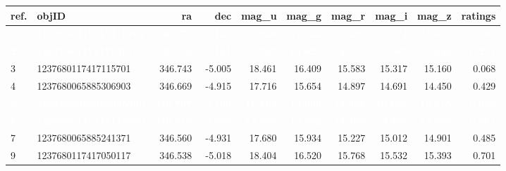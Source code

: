 \documentclass[]{elsarticle} %
\begin{document}
\begin{table}[H]
\centering
\begin{tabular}{l|l|r|r|r|r|r|r|r|r}
\hline
ref. & objID & ra & dec & mag\_u & mag\_g & mag\_r & mag\_i & mag\_z & ratings\\
\hline
\rowcolor[HTML]{D7261E}  \textcolor{white}{\textbf{1}} & \textcolor{white}{\textbf{1237680117417115762}} & \textcolor{white}{\textbf{346.676}} & \textcolor{white}{\textbf{-5.120}} & \textcolor{white}{\textbf{18.920}} & \textcolor{white}{\textbf{17.022}} & \textcolor{white}{\textbf{16.282}} & \textcolor{white}{\textbf{15.974}} & \textcolor{white}{\textbf{15.851}} & \textcolor{white}{\textbf{0.380}}\\
\hline
\rowcolor[HTML]{D7261E}  \textcolor{white}{\textbf{2}} & \textcolor{white}{\textbf{1237680117417050133}} & \textcolor{white}{\textbf{346.594}} & \textcolor{white}{\textbf{-5.161}} & \textcolor{white}{\textbf{16.702}} & \textcolor{white}{\textbf{14.825}} & \textcolor{white}{\textbf{14.068}} & \textcolor{white}{\textbf{13.887}} & \textcolor{white}{\textbf{13.648}} & \textcolor{white}{\textbf{0.241}}\\
\hline
3 & 1237680117417115701 & 346.743 & -5.005 & 18.461 & 16.409 & 15.583 & 15.317 & 15.160 & 0.068\\
\hline
4 & 1237680065885306903 & 346.669 & -4.915 & 17.716 & 15.654 & 14.897 & 14.691 & 14.450 & 0.429\\
\hline
\rowcolor[HTML]{D7261E}  \textcolor{white}{\textbf{5}} & \textcolor{white}{\textbf{1237680065348435996}} & \textcolor{white}{\textbf{346.707}} & \textcolor{white}{\textbf{-5.199}} & \textcolor{white}{\textbf{16.704}} & \textcolor{white}{\textbf{14.699}} & \textcolor{white}{\textbf{13.905}} & \textcolor{white}{\textbf{13.676}} & \textcolor{white}{\textbf{13.515}} & \textcolor{white}{\textbf{0.322}}\\
\hline
\rowcolor[HTML]{D7261E}  \textcolor{white}{\textbf{6}} & \textcolor{white}{\textbf{1237680117417115683}} & \textcolor{white}{\textbf{346.713}} & \textcolor{white}{\textbf{-5.050}} & \textcolor{white}{\textbf{17.585}} & \textcolor{white}{\textbf{15.782}} & \textcolor{white}{\textbf{15.109}} & \textcolor{white}{\textbf{14.867}} & \textcolor{white}{\textbf{14.798}} & \textcolor{white}{\textbf{0.361}}\\
\hline
7 & 1237680065885241371 & 346.560 & -4.931 & 17.680 & 15.934 & 15.227 & 15.012 & 14.901 & 0.485\\
\hline
9 & 1237680117417050117 & 346.538 & -5.018 & 18.404 & 16.520 & 15.768 & 15.532 & 15.393 & 0.701\\

\end{tabular}
\end{table}
\end{document}
